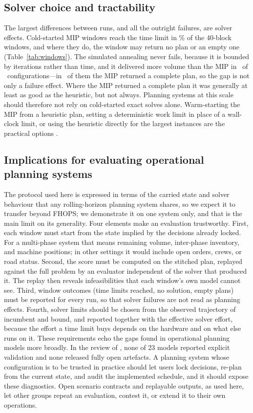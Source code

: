 \subsection{Solver choice and tractability}

The largest differences between runs, and all the outright failures, are solver effects. Cold-started
MIP windows reach the time limit in \WindowsStageOneLimitMIPForty\% of the 40-block windows, and where they do, the window may
return no plan or an empty one (Table~\ref{tab:windows}). The simulated annealing never fails,
because it is bounded by iterations rather than time, and it delivered more volume than the MIP in
\NPairsSAWinsAny\ of \NPairsAll\ configurations---in \NPairsSAWinsMIPClean\ of them the MIP
returned a complete plan, so the gap is not only a failure effect. Where the MIP returned a complete
plan it was generally at least as good as the heuristic, but not always. Planning systems at this
scale should therefore not rely on cold-started exact solves alone. Warm-starting the MIP from a heuristic plan, setting a deterministic work limit in
place of a wall-clock limit, or using the heuristic directly for the largest instances are the
practical options \citep{frisk2016detailed,audy2023planning}.

\subsection{Implications for evaluating operational planning systems}
The protocol used here is expressed in terms of the carried state and solver behaviour that any
rolling-horizon planning system shares, so we expect it to transfer beyond FHOPS; we demonstrate it
on one system only, and that is the main limit on its generality.
Four elements make an evaluation trustworthy. First, each window must start from the state implied
by the decisions already locked. For a multi-phase system that means remaining volume, inter-phase
inventory, and machine positions; in other settings it would include open orders, crews, or road
status. Second, the score must be computed on the stitched plan, replayed against the full problem
by an evaluator independent of the solver that produced it. The replay then reveals infeasibilities
that each window's own model cannot see. Third, window outcomes (time limits reached, no solution,
empty plans) must be reported for every run, so that solver failures are not read as planning
effects. Fourth, solver limits should be chosen from the observed trajectory of incumbent and
bound, and reported together with the effective solver effort, because the effort a time limit buys
depends on the hardware and on what else runs on it. These requirements echo the gaps found in
operational planning models more broadly. In the review of \citet{jaffray2026thesis}, none of 23
models reported explicit validation and none released fully open artefacts. A planning system whose
configuration is to be trusted in practice should let users lock decisions, re-plan from the current
state, and audit the implemented schedule, and it should expose these diagnostics. Open scenario
contracts and replayable outputs, as used here, let other groups repeat an evaluation, contest it,
or extend it to their own operations.

